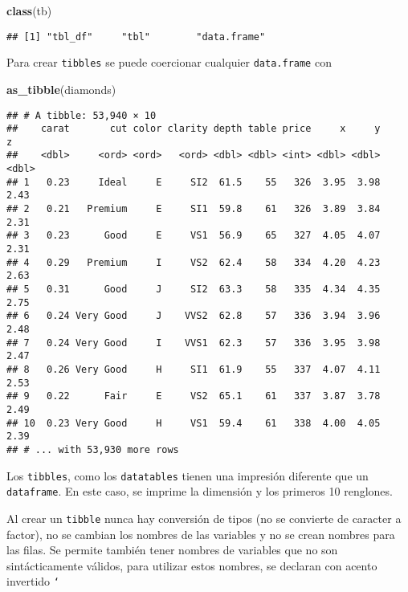 \documentclass[]{article}
\newenvironment{Shaded}{\begin{snugshade}}{\end{snugshade}}
\newcommand{\KeywordTok}[1]{\textcolor[rgb]{0.13,0.29,0.53}{\textbf{#1}}}
\newcommand{\NormalTok}[1]{#1}
\begin{document}
\begin{Shaded}
\begin{Highlighting}[]
\KeywordTok{class}\NormalTok{(tb)}
\end{Highlighting}
\end{Shaded}

\begin{verbatim}
## [1] "tbl_df"     "tbl"        "data.frame"
\end{verbatim}

Para crear \texttt{tibbles} se puede coercionar cualquier
\texttt{data.frame} con

\begin{Shaded}
\begin{Highlighting}[]
\KeywordTok{as_tibble}\NormalTok{(diamonds)}
\end{Highlighting}
\end{Shaded}

\begin{verbatim}
## # A tibble: 53,940 × 10
##    carat       cut color clarity depth table price     x     y     z
##    <dbl>     <ord> <ord>   <ord> <dbl> <dbl> <int> <dbl> <dbl> <dbl>
## 1   0.23     Ideal     E     SI2  61.5    55   326  3.95  3.98  2.43
## 2   0.21   Premium     E     SI1  59.8    61   326  3.89  3.84  2.31
## 3   0.23      Good     E     VS1  56.9    65   327  4.05  4.07  2.31
## 4   0.29   Premium     I     VS2  62.4    58   334  4.20  4.23  2.63
## 5   0.31      Good     J     SI2  63.3    58   335  4.34  4.35  2.75
## 6   0.24 Very Good     J    VVS2  62.8    57   336  3.94  3.96  2.48
## 7   0.24 Very Good     I    VVS1  62.3    57   336  3.95  3.98  2.47
## 8   0.26 Very Good     H     SI1  61.9    55   337  4.07  4.11  2.53
## 9   0.22      Fair     E     VS2  65.1    61   337  3.87  3.78  2.49
## 10  0.23 Very Good     H     VS1  59.4    61   338  4.00  4.05  2.39
## # ... with 53,930 more rows
\end{verbatim}

Los \texttt{tibbles}, como los \texttt{datatables} tienen una impresión
diferente que un \texttt{dataframe}. En este caso, se imprime la
dimensión y los primeros 10 renglones.

Al crear un \texttt{tibble} nunca hay conversión de tipos (no se
convierte de caracter a factor), no se cambian los nombres de las
variables y no se crean nombres para las filas. Se permite también tener
nombres de variables que no son sintácticamente válidos, para utilizar
estos nombres, se declaran con acento invertido \texttt{`}
\end{document}
